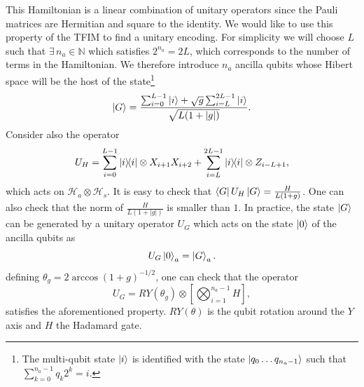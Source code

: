 \documentclass[a4paper,11pt]{article}
\begin{document}
This Hamiltonian is a linear combination of unitary operators since the Pauli matrices are Hermitian and square to the identity. We would like to use this property of the TFIM to find a unitary encoding. For simplicity we will choose $L$ such that $\exists\, n_a\in \mathbb{N}$ which satisfies $2^{n_a}=2L$, which corresponds to the number of terms in the Hamiltonian. We therefore introduce $n_a$ ancilla qubits whose Hibert space will be the host of the state\footnote{The multi-qubit state $\ket{i}$ is identified with the state $\ket{q_0\ldots q_{n_a-1}}$ such that $\sum_{k=0}^{n_a-1}q_k 2^k = i$.}
\begin{equation}
    \ket{G}=\frac{\sum_{i=0}^{L-1}\ket{i}+\sqrt{g}\sum_{i=L}^{2L-1}\ket{i}}{\sqrt{L(1+|g|)}}.
\end{equation}
Consider also the operator
\begin{equation}
    U_H = \sum_{i=0}^{L-1} \ketbra{i}\otimes X_{i+1}X_{i+2}+
    \sum_{i=L}^{2L-1} \ketbra{i}\otimes Z_{i-L+1},
\end{equation}
which acts on $\mathcal{H}_a\otimes \mathcal{H}_s$. It is easy to check that $\bra{G}U_H\ket{G}=\frac{H}{L(1+g)}$. One can also check that the norm of $\frac{H}{L(1+|g|)}$ is smaller than $1$. In practice, the state $\ket{G}$ can be generated by a unitary operator $U_G$ which acts on the state $\ket{0}$ of the ancilla qubits as
\begin{equation}
  U_G\ket{0}_a = \ket{G}_a.  
\end{equation}
defining $\theta_g=2 \arccos{(1+g)^{-1/2}}$, one can check that the operator 
\begin{equation}
    U_G = RY(\theta_g)\otimes \left[\bigotimes_{i=1}^{n_a - 1}H\right],
\end{equation}
satisfies the aforementioned property. $RY(\theta)$ is the qubit rotation around the $Y$ axis and $H$ the Hadamard gate.
\end{document}
